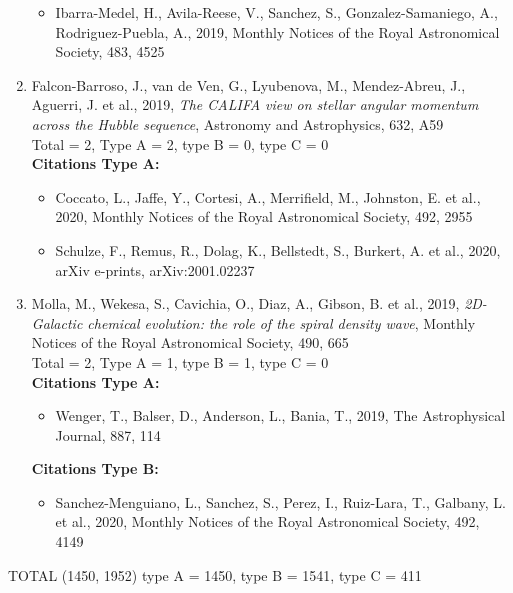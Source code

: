 \documentclass{letter}
\begin{document}
\begin{enumerate}
\begin{itemize}
\item Ibarra-Medel, H., Avila-Reese, V., Sanchez, S., Gonzalez-Samaniego, A., Rodriguez-Puebla, A., 2019, Monthly Notices of the Royal Astronomical Society, 483, 4525
\end{itemize}
\item Falcon-Barroso, J., van de Ven, G., Lyubenova, M., Mendez-Abreu, J., Aguerri, J. et al., 2019, {\it The CALIFA view on stellar angular momentum across the Hubble sequence}, Astronomy and Astrophysics, 632, A59 \\ 
Total = 2, Type A = 2, type B = 0, type C = 0 \\ 
{\bf Citations Type A:}
\begin{itemize}
\item Coccato, L., Jaffe, Y., Cortesi, A., Merrifield, M., Johnston, E. et al., 2020, Monthly Notices of the Royal Astronomical Society, 492, 2955
\item Schulze, F., Remus, R., Dolag, K., Bellstedt, S., Burkert, A. et al., 2020, arXiv e-prints, arXiv:2001.02237
\end{itemize}
\item Molla, M., Wekesa, S., Cavichia, O., Diaz, A., Gibson, B. et al., 2019, {\it 2D-Galactic chemical evolution: the role of the spiral density wave}, Monthly Notices of the Royal Astronomical Society, 490, 665 \\ 
Total = 2, Type A = 1, type B = 1, type C = 0 \\ 
{\bf Citations Type A:}
\begin{itemize}
\item Wenger, T., Balser, D., Anderson, L., Bania, T., 2019, The Astrophysical Journal, 887, 114
\end{itemize}
{\bf Citations Type B:}
\begin{itemize}
\item Sanchez-Menguiano, L., Sanchez, S., Perez, I., Ruiz-Lara, T., Galbany, L. et al., 2020, Monthly Notices of the Royal Astronomical Society, 492, 4149
\end{itemize}
\end{enumerate}
TOTAL (1450, 1952) type A = 1450, type B = 1541, type C = 411
\end{document}
